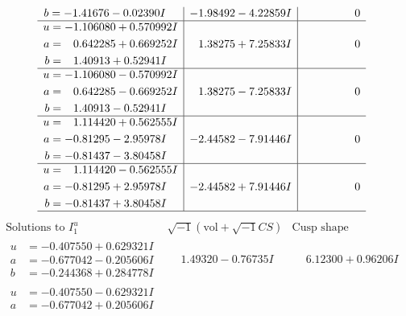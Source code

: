 \documentclass[1p]{elsarticle_modified}
\theoremstyle{definition}
\newcommand{\I}{\sqrt{-1}}
\begin{document}
$$\begin{array}{c|c|c}
\begin{aligned}
b &= -1.41676 - 0.02390 I\end{aligned}
 & -1.98492 - 4.22859 I & \phantom{-0.000000 } 0 \\ \hline\begin{aligned}
u &= -1.106080 + 0.570992 I \\
a &= \phantom{-}0.642285 + 0.669252 I \\
b &= \phantom{-}1.40913 + 0.52941 I\end{aligned}
 & \phantom{-}1.38275 + 7.25833 I & \phantom{-0.000000 } 0 \\ \hline\begin{aligned}
u &= -1.106080 - 0.570992 I \\
a &= \phantom{-}0.642285 - 0.669252 I \\
b &= \phantom{-}1.40913 - 0.52941 I\end{aligned}
 & \phantom{-}1.38275 - 7.25833 I & \phantom{-0.000000 } 0 \\ \hline\begin{aligned}
u &= \phantom{-}1.114420 + 0.562555 I \\
a &= -0.81295 - 2.95978 I \\
b &= -0.81437 - 3.80458 I\end{aligned}
 & -2.44582 - 7.91446 I & \phantom{-0.000000 } 0 \\ \hline\begin{aligned}
u &= \phantom{-}1.114420 - 0.562555 I \\
a &= -0.81295 + 2.95978 I \\
b &= -0.81437 + 3.80458 I\end{aligned}
 & -2.44582 + 7.91446 I & \phantom{-0.000000 } 0\\
 \hline 
 \end{array}$$\newpage$$\begin{array}{c|c|c}  
\text{Solutions to }I^u_{1}& \I (\text{vol} + \sqrt{-1}CS) & \text{Cusp shape}\\
 \hline 
\begin{aligned}
u &= -0.407550 + 0.629321 I \\
a &= -0.677042 - 0.205606 I \\
b &= -0.244368 + 0.284778 I\end{aligned}
 & \phantom{-}1.49320 - 0.76735 I & \phantom{-}6.12300 + 0.96206 I \\ \hline\begin{aligned}
u &= -0.407550 - 0.629321 I \\
a &= -0.677042 + 0.205606 I \\

\end{aligned}
\end{array}$$
\end{document}
